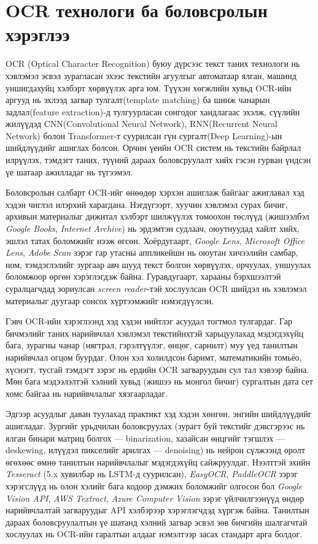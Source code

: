 \section{OCR технологи ба боловсролын хэрэглээ}

OCR (Optical Character Recognition) буюу дүрсээс текст таних технологи нь хэвлэмэл эсвэл зурагласан эхээс текстийн агуулгыг автоматаар ялган, машинд уншигдахуйц хэлбэрт хөрвүүлэх арга юм. Түүхэн хөгжлийн хувьд OCR-ийн аргууд нь эхлээд загвар тулгалт(template matching) ба шинж чанарын задлал(feature extraction)-д тулгуурласан сонгодог хандлагаас эхэлж, сүүлийн жилүүдэд CNN(Convolutional Neural Network), RNN(Recurrent Neural Network) болон Transformer-т суурилсан гүн сургалт(Deep Learning)-ын шийдлүүдийг ашиглах болсон. Орчин үеийн OCR систем нь текстийн байрлал илрүүлэх, тэмдэгт таних, түүний дараах боловсруулалт хийх гэсэн гурван үндсэн үе шатаар ажилладаг нь түгээмэл.

Боловсролын салбарт OCR-ийг өнөөдөр хэрхэн ашиглаж байгааг ажиглавал хэд хэдэн чиглэл илэрхий харагдана. Нэгдүгээрт, хуучин хэвлэмэл сурах бичиг, архивын материалыг дижитал хэлбэрт шилжүүлэх томоохон төслүүд (жишээлбэл \textit{Google Books}, \textit{Internet Archive}) нь эрдэмтэн судлаач, оюутнуудад хайлт хийх, эшлэл татах боломжийг нээж өгсөн. Хоёрдугаарт, \textit{Google Lens}, \textit{Microsoft Office Lens}, \textit{Adobe Scan} зэрэг гар утасны аппликейшн нь оюутан хичээлийн самбар, ном, тэмдэглэлийг зургаар авч шууд текст болгон хөрвүүлэх, орчуулах, уншуулах боломжоор өргөн хэрэглэгдэж байна. Гуравдугаарт, харааны бэрхшээлтэй суралцагчдад зориулсан \textit{screen reader}-тэй хослуулсан OCR шийдэл нь хэвлэмэл материалыг дуугаар сонсох хүртээмжийг нэмэгдүүлсэн.

Гэвч OCR-ийн хэрэглээнд хэд хэдэн нийтлэг асуудал тогтмол тулгардаг. Гар бичмэлийг таних нарийвчлал хэвлэмэл текстийнхтэй харьцуулахад мэдэгдэхүйц бага, зурагны чанар (нягтрал, гэрэлтүүлэг, өнцөг, сарнилт) муу үед танилтын нарийвчлал огцом буурдаг. Олон хэл холилдсон баримт, математикийн томьёо, хүснэгт, тусгай тэмдэгт зэрэг нь ердийн OCR загваруудын сул тал хэвээр байна. Мөн бага мэдээлэлтэй хэлний хувьд (жишээ нь монгол бичиг) сургалтын дата сет хомс байгаа нь нарийвчлалыг хязгаарладаг.

Эдгээр асуудлыг даван туулахад практикт хэд хэдэн хөнгөн, энгийн шийдлүүдийг ашигладаг. Зургийг урьдчилан боловсруулах (зурагт буй текстийг дэвсгэрээс нь ялган бинари матриц болгох — binarization, хазайсан өнцгийг тэгшлэх — deskewing, илүүдэл пикселийг арилгах — denoising) нь нейрон сүлжээнд оролт өгөхөөс өмнө танилтын нарийвчлалыг мэдэгдэхүйц сайжруулдаг. Нээлттэй эхийн \textit{Tesseract} (5.x хувилбар нь LSTM-д суурилсан), \textit{EasyOCR}, \textit{PaddleOCR} зэрэг хэрэгслүүд нь олон хэлийг бага кодоор дэмжих боломжийг олгосон бол \textit{Google Vision API}, \textit{AWS Textract}, \textit{Azure Computer Vision} зэрэг үйлчилгээнүүд өндөр нарийвчлалтай загваруудыг API хэлбэрээр хэрэглэгчдэд хүргэж байна. Танилтын дараах боловсруулалтын үе шатанд хэлний загвар эсвэл зөв бичгийн шалгагчтай хослуулах нь OCR-ийн гаралтын алдааг нэмэлтээр засах стандарт арга болдог.



